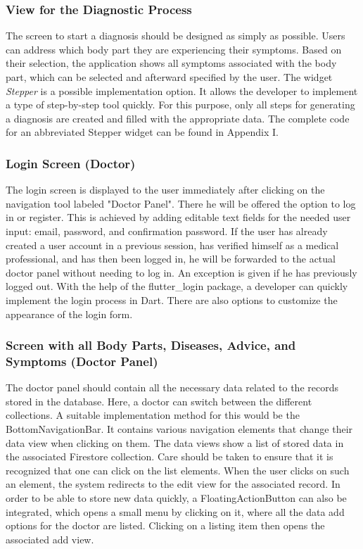 \subsubsection{\textbf{View for the Diagnostic Process}}
The screen to start a diagnosis should be designed as simply as possible. Users can address which body part they are experiencing their symptoms. Based on their selection, the application shows all symptoms associated with the body part, which can be selected and afterward specified by the user. The widget \textit{Stepper} is a possible implementation option. It allows the developer to implement a type of step-by-step tool quickly. For this purpose, only all steps for generating a diagnosis are created and filled with the appropriate data. The complete code for an abbreviated Stepper widget can be found in Appendix I.

\subsubsection{\textbf{Login Screen (Doctor)}}
The login screen is displayed to the user immediately after clicking on the navigation tool labeled "Doctor Panel". There he will be offered the option to log in or register. This is achieved by adding editable text fields for the needed user input: email, password, and confirmation password. If the user has already created a user account in a previous session, has verified himself as a medical professional, and has then been logged in, he will be forwarded to the actual doctor panel without needing to log in. An exception is given if he has previously logged out. With the help of the flutter\_login package, a developer can quickly implement the login process in Dart. There are also options to customize the appearance of the login form.

\subsubsection{\textbf{Screen with all Body Parts, Diseases, Advice, and Symptoms (Doctor Panel)}}
The doctor panel should contain all the necessary data related to the records stored in the database. Here, a doctor can switch between the different collections. A suitable implementation method for this would be the BottomNavigationBar. It contains various navigation elements that change their data view when clicking on them. The data views show a list of stored data in the associated Firestore collection. Care should be taken to ensure that it is recognized that one can click on the list elements. When the user clicks on such an element, the system redirects to the edit view for the associated record. In order to be able to store new data quickly, a FloatingActionButton can also be integrated, which opens a small menu by clicking on it, where all the data add options for the doctor are listed. Clicking on a listing item then opens the associated add view.

